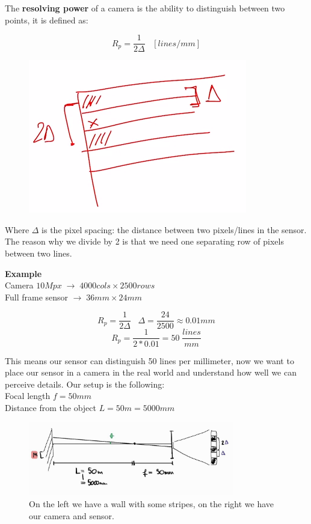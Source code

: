 The \textbf{resolving power} of a camera is the ability to distinguish between two points, it is defined as:


\begin{multicols}{2}
\[
    R_p = \frac{1}{2\Delta}\;\;\; [lines/mm]     
\]
\begin{figure}[H]
    \includegraphics[scale=0.3]{Figures/separation.png}
\end{figure}
\end{multicols}

Where $\Delta$ is the pixel spacing: the distance between two pixels/lines in the sensor. The reason why we divide by 2 is that we need one separating row of pixels between two lines.

\textbf{Example}
\\
Camera \(10Mpx \; \rightarrow \; 4000 cols \times 2500 rows \) \\
Full frame sensor \(\rightarrow \; 36mm \times 24mm \)

\[
    R_p = \frac{1}{2\Delta} \;\;\; \Delta = \frac{24}{2500} \approx 0.01mm 
\]
\[
    R_p = \frac{1}{2 * 0.01} = 50 \; \frac{lines}{mm}    
\]

This means our sensor can distinguish 50 lines per millimeter, now we want to place our sensor in a camera in the real world and understand how well we can perceive details. Our setup is the following:\\
Focal length \(f = 50mm\) \\
Distance from the object \(L = 50m = 5000mm\) \\

\begin{figure}[H]
    \centering
    \includegraphics[width=0.8\textwidth]{Figures/rp.png}
    \caption{On the left we have a wall with some stripes, on the right we have our camera and sensor.}
    \label{fig:rp}
\end{figure}


